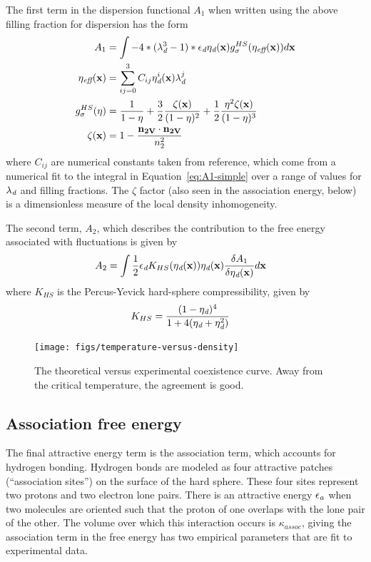 \documentclass[letterpaper,twocolumn,amsmath,amssymb,prb]{revtex4-1}
\newcommand{\xx}{\textbf{x}}
\begin{document}
The first term in the dispersion functional $A_1$ when written using
the above filling fraction for dispersion has the form
\begin{align}
  A_1 &= \int
   -4*(\lambdadisp^3 - 1)*\epsilondisp \etadisp(\xx)
    g^{HS}_\sigma(\eta_\textit{eff}(\xx))
  d\xx \\
  \eta_\textit{eff}(\xx) &= \sum_{ij=0}^3 C_{ij}  \etadisp^i(\xx)
  \lambdadisp^j
  \\
  g_\sigma^{HS}(\eta) &= \frac{1}{1-\eta}
  +\frac32\frac{\zeta(\xx)}{(1-\eta)^2}
  + \frac12\frac{\eta^2\zeta(\xx)}{(1-\eta)^3}
  \\
  \zeta(\xx) &= 1 - \frac{\mathbf{n_{2V}}\cdot\mathbf{n_{2V}}}{n_2^2}
\end{align}
where $C_{ij}$ are numerical constants taken from
reference\cite{gil-villegas-1997-SAFT-VR}, which come from a numerical
fit to the integral in Equation~\ref{eq:A1-simple} over a range of
values for $\lambda_\textit{d}$ and filling fractions.  The $\zeta$ factor
(also seen in the association energy, below) is a dimensionless
measure of the local density inhomogeneity.

The second term, $A_2$, which describes the contribution to the free
energy associated with fluctuations is given by
\begin{align}
  A_2 &= \int \frac12 \epsilondisp
              K_{HS}(\etadisp(\xx))
              \etadisp(\xx)
              \frac{\delta A_1}{\delta \etadisp(\xx)}
                d\xx
\end{align}
where $K_{HS}$ is the Percus-Yevick hard-sphere compressibility, given
by
\begin{align}
  K_{HS} &=
    \frac{(1 - \eta_\textit{d})^4}{1 + 4(\eta_\textit{d} + \eta_\textit{d}^2)}
\end{align}

\begin{figure}
\begin{center}
\texttt{[image: figs/temperature-versus-density]}
\end{center}
\caption{The theoretical versus experimental coexistence curve. Away from
the critical temperature, the agreement is good. }
\label{fig:temperature-vs-density}
\end{figure}

\subsection{Association free energy}
The final attractive energy term is the association term, which
accounts for hydrogen bonding.  Hydrogen bonds are modeled as four
attractive patches (``association sites'') on the surface of the hard
sphere.  These four sites represent two protons and two electron lone
pairs.  There is an attractive energy $\epsilon_\textit{a}$ when
two molecules are oriented such that the proton of one overlaps
with the lone pair of the other.  The volume over which this
interaction occurs is $\kappa_\textit{assoc}$, giving the association
term in the free energy has two empirical parameters that are fit to
experimental data.
\end{document}
